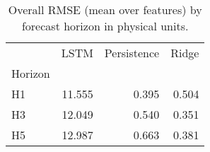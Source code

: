 \begin{table}
\caption{Overall RMSE (mean over features) by forecast horizon in physical units.}
\label{tab:rmse_overall_phys}
\begin{tabular}{lrrr}
\toprule
 & LSTM & Persistence & Ridge \\
Horizon &  &  &  \\
\midrule
H1 & 11.555 & 0.395 & 0.504 \\
H3 & 12.049 & 0.540 & 0.351 \\
H5 & 12.987 & 0.663 & 0.381 \\
\bottomrule
\end{tabular}
\end{table}
